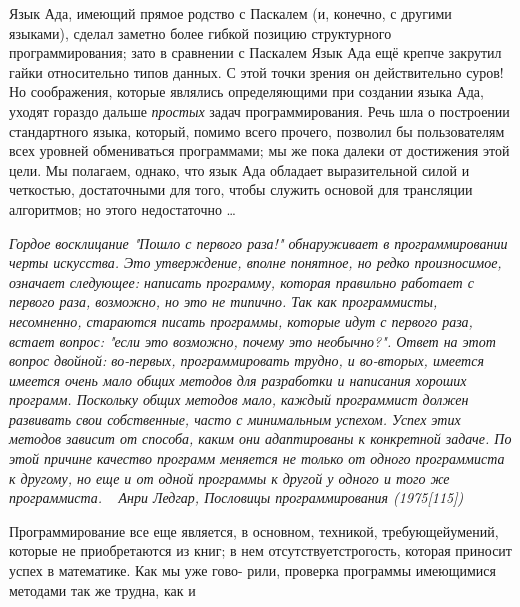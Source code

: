 \documentclass{mai_book}
\begin{document}
Язык Ада, имеющий прямое родство с Паскалем (и, конечно, с другими языками), сделал заметно более гибкой позицию структурного программирования; зато в сравнении с Паскалем Язык Ада ещё крепче закрутил гайки относительно типов данных. С этой точки зрения он действительно суров! Но соображения, которые являлись определяющими при создании языка Ада, уходят гораздо дальше \textit{простых} задач программирования. Речь шла о построении стандартного языка, который, помимо всего прочего, позволил бы пользователям всех уровней обмениваться программами; мы же пока далеки от достижения этой цели. Мы полагаем, однако, что язык Ада обладает выразительной силой и четкостью, достаточными для того, чтобы служить основой для трансляции алгоритмов; но этого недостаточно \dots
\begin{flushright}


\parbox{11.5cm}{ 
\textit{\hspace*{15pt}Гордое восклицание "Пошло с первого раза!" обнаруживает в программировании черты искусства. Это утверждение, вполне понятное, но редко произносимое, означает следующее: написать программу, которая правильно работает с первого раза, возможно, но это не типично. Так как программисты, несомненно, стараются писать программы, которые идут с первого раза, встает вопрос: "если это возможно, почему это необычно?". Ответ  на этот вопрос двойной: во-первых, программировать трудно, и во-вторых, имеется имеется очень мало общих методов для разработки и написания хороших программ. Поскольку общих методов мало, каждый программист должен развивать свои собственные, часто с минимальным успехом. Успех этих методов зависит от способа, каким они адаптированы к конкретной задаче. По этой причине качество программ меняется не только от одного программиста к другому, но еще и от одной программы к другой у одного и того же программиста.}\newline
\ \newline
               \textit{Анри Ледгар, Пословицы программирования (1975[115])}
}
\end{flushright}
Программирование все еще является, в основном, техникой, требующей\linebreak умений, которые не приобретаются из книг; в нем отсутствует\linebreak строгость, которая приносит успех в математике. Как мы уже гово-\linebreak
рили, проверка программы имеющимися методами так же трудна, как и

\newpage
\end{document}
